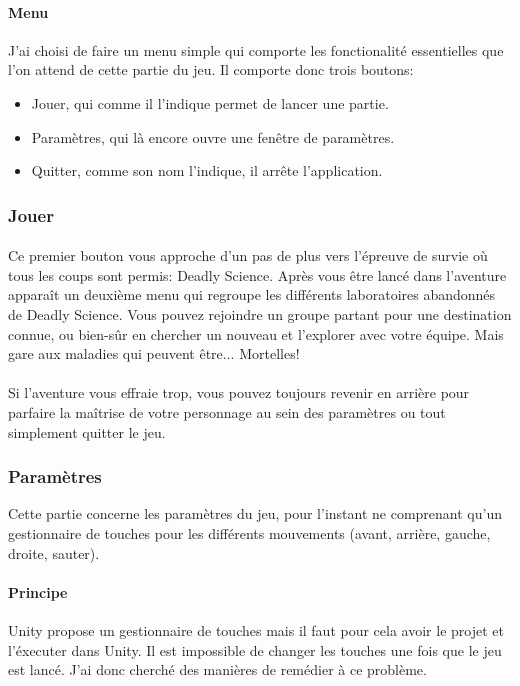 \documentclass{article}
\begin{document}
\paragraph{Menu}

J'ai choisi de faire un menu simple qui comporte les fonctionalité essentielles que l'on attend de cette partie du jeu. Il comporte donc trois boutons:

\begin{itemize}
    \item Jouer, qui comme il l'indique permet de lancer une partie.
    \item Paramètres, qui là encore ouvre une fenêtre de paramètres.
    \item Quitter, comme son nom l'indique, il arrête l'application.
\end{itemize}

\subsubsection{Jouer}

\paragraph{}
Ce premier bouton vous approche d'un pas de plus vers l'épreuve de survie où tous les coups sont permis: Deadly Science. Après vous être lancé dans l'aventure apparaît un deuxième menu qui regroupe les différents laboratoires abandonnés de Deadly Science. Vous pouvez rejoindre un groupe partant pour une destination connue, ou bien-sûr en chercher un nouveau et l'explorer avec votre équipe. Mais gare aux maladies qui peuvent être... Mortelles!
\paragraph{} Si l'aventure vous effraie trop, vous pouvez toujours revenir en arrière pour parfaire la maîtrise de votre personnage au sein des paramètres ou tout simplement quitter le jeu.

\subsubsection{Paramètres}
Cette partie concerne les paramètres du jeu, pour l'instant ne comprenant qu'un gestionnaire de touches pour les différents mouvements (avant, arrière, gauche, droite, sauter).

\paragraph{Principe}
Unity propose un gestionnaire de touches mais il faut pour cela avoir le projet et l'éxecuter dans Unity.
Il est impossible de changer les touches une fois que le jeu est lancé. J'ai donc cherché des manières de remédier à ce problème.
\end{document}
